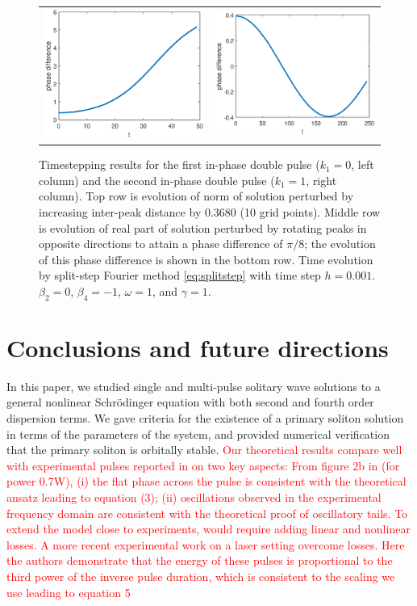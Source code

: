 \documentclass[12pt]{elsarticle}
\newcommand{\revised}[1]{ \textcolor{red}{#1} }
\begin{document}
\begin{figure}[H]
\begin{tabular}{cc}
\includegraphics[width=6cm]{images/DP0ppphasedifference} &
\includegraphics[width=6cm]{images/DP1ppphasedifference}
\end{tabular}
\caption{Timestepping results for the first in-phase double pulse ($k_1 = 0$, left column) and the second in-phase double pulse ($k_1 = 1$, right column). Top row is evolution of norm of solution perturbed by increasing inter-peak distance by $0.3680$ (10 grid points). Middle row is evolution of real part of solution perturbed by rotating peaks in opposite directions to attain a phase difference of $\pi/8$; the evolution of this phase difference is shown in the bottom row. Time evolution by split-step Fourier method \cref{eq:splitstep} with time step $h = 0.001$. $\beta_2 = 0$, $\beta_4 = -1$, $\omega = 1$, and $\gamma = 1$.}
\label{fig:timestep0pp}
\end{figure}

\section{Conclusions and future directions}

In this paper, we studied single and multi-pulse solitary wave solutions to a general nonlinear Schr{\"o}dinger equation with both second and fourth order dispersion terms. We gave criteria for the existence of a primary soliton solution in terms of the parameters of the system, and provided numerical verification that the primary soliton is orbitally stable. \revised{Our theoretical results compare well with experimental pulses reported in \cite{BlancoPQS} on two key aspects: From figure 2b in\cite{BlancoPQS} (for power 0.7W), (i) the flat phase across the pulse is consistent with the theoretical ansatz leading to equation (3); (ii) oscillations observed in the experimental frequency domain are consistent with the theoretical proof of oscillatory tails. To extend the model close to experiments, would require adding linear and nonlinear losses. A more recent experimental work on a laser setting \cite{Blanco_laser} overcome losses. Here the authors demonstrate that the energy of these pulses is proportional to the third power of the inverse pulse duration, which is consistent to the scaling we use leading to equation 5}   
\end{document}
